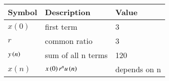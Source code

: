 \begin{tabular}{ | m{1.0cm} | m{3cm} |m{1cm} |} 
  \hline
 Symbol &Description& Value \\ 
 \hline
$x(0)$&first term& 3  \\
\hline
$r$&common ratio & 3  \\
\hline
$y\left(n\right)$& sum of all n terms&120 \\
\hline
$x(n)$&$x \left(0\right)r^{n}u\left(n\right)$&  depends on n\\
\hline
\end{tabular}\\
\caption{}
\label{Table:1}
